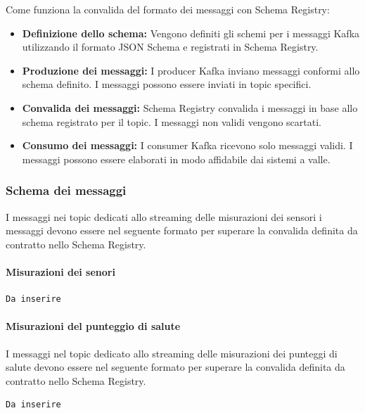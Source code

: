 Come funziona la convalida del formato dei messaggi con Schema Registry:
\begin{itemize}
    \item \textbf{Definizione dello schema:} Vengono definiti gli schemi per i messaggi Kafka utilizzando il formato JSON Schema e registrati in Schema Registry.
    \item \textbf{Produzione dei messaggi:} I producer Kafka inviano messaggi conformi allo schema definito. I messaggi possono essere inviati in topic specifici.
    \item \textbf{Convalida dei messaggi:} Schema Registry convalida i messaggi in base allo schema registrato per il topic. I messaggi non validi vengono scartati.
    \item \textbf{Consumo dei messaggi:} I consumer Kafka ricevono solo messaggi validi. I messaggi possono essere elaborati in modo affidabile dai sistemi a valle.
\end{itemize}

\subsubsection{Schema dei messaggi}\label{sec:schema_registry_sez_schema}
I messaggi nei topic dedicati allo streaming delle misurazioni dei sensori i messaggi devono essere nel seguente formato per superare la convalida definita da contratto nello Schema Registry.
\paragraph{Misurazioni dei senori}
\begin{lstlisting}[style=code]
    Da inserire
\end{lstlisting}


\paragraph{Misurazioni del punteggio di salute}
I messaggi nel topic dedicato allo streaming delle misurazioni dei punteggi di salute devono essere nel seguente formato per superare la convalida definita da contratto nello Schema Registry.
\begin{lstlisting}[style=code]
    Da inserire
\end{lstlisting}